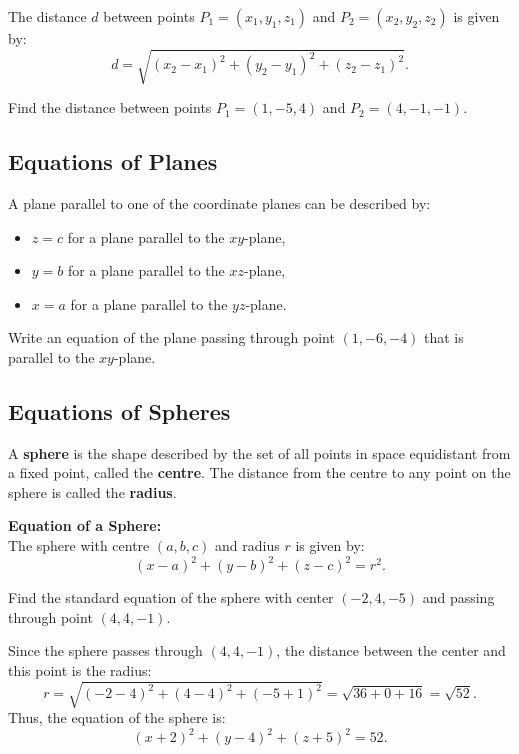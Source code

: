 \documentclass{article}
\begin{document}
\begin{theorembox}
    The distance \(d\) between points \(P_1 = (x_1, y_1, z_1)\) and \(P_2 = (x_2, y_2, z_2)\) is given by:
    \[
    d = \sqrt{(x_2 - x_1)^2 + (y_2 - y_1)^2 + (z_2 - z_1)^2}.
    \]
\end{theorembox}

\begin{exercisebox}
    Find the distance between points \(P_1 = (1, -5, 4)\) and \(P_2 = (4, -1, -1)\).
\end{exercisebox}

\subsection*{Equations of Planes}

A plane parallel to one of the coordinate planes can be described by:
\begin{itemize}
    \item \(z = c\) for a plane parallel to the \(xy\)-plane,
    \item \(y = b\) for a plane parallel to the \(xz\)-plane,
    \item \(x = a\) for a plane parallel to the \(yz\)-plane.
\end{itemize}

\begin{exercisebox}
    Write an equation of the plane passing through point \((1, -6, -4)\) that is parallel to the \(xy\)-plane.
\end{exercisebox}

\subsection*{Equations of Spheres}

A \textbf{sphere} is the shape described by the set of all points in space equidistant from a fixed point, called the \textbf{centre}. The distance from the centre to any point on the sphere is called the \textbf{radius}.

\begin{theorembox}
    \textbf{Equation of a Sphere:} \\
    The sphere with centre \((a, b, c)\) and radius \(r\) is given by:
    \[
    (x - a)^2 + (y - b)^2 + (z - c)^2 = r^2.
    \]
\end{theorembox}

\begin{examplebox}
    Find the standard equation of the sphere with center \((-2, 4, -5)\) and passing through point \((4, 4, -1)\).

    \begin{solutionbox}
        Since the sphere passes through \((4, 4, -1)\), the distance between the center and this point is the radius:
        \[
        r = \sqrt{(-2 - 4)^2 + (4 - 4)^2 + (-5 + 1)^2} = \sqrt{36 + 0 + 16} = \sqrt{52}.
        \]
        Thus, the equation of the sphere is:
        \[
        (x + 2)^2 + (y - 4)^2 + (z + 5)^2 = 52.
        \]
    \end{solutionbox}
\end{examplebox}
\end{document}
